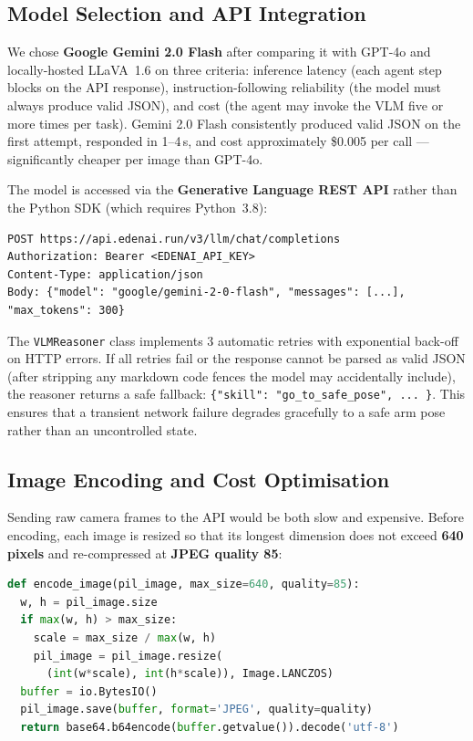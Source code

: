 \subsection{Model Selection and API Integration}

We chose \textbf{Google Gemini 2.0 Flash} after comparing it with GPT-4o and
locally-hosted LLaVA~1.6 on three criteria: inference latency (each agent step
blocks on the API response), instruction-following reliability (the model must
always produce valid JSON), and cost (the agent may invoke the VLM five or more
times per task).
Gemini 2.0 Flash consistently produced valid JSON on the first attempt,
responded in 1--4\,s, and cost approximately \$0.005 per call --- significantly
cheaper per image than GPT-4o.

The model is accessed via the \textbf{Generative Language REST API} rather than
the Python SDK (which requires Python~3.8):

\begin{lstlisting}[language={}, numbers=none,
    caption={REST API endpoint for Gemini 2.0 Flash via Eden AI.}]
POST https://api.edenai.run/v3/llm/chat/completions
Authorization: Bearer <EDENAI_API_KEY>
Content-Type: application/json
Body: {"model": "google/gemini-2-0-flash", "messages": [...], "max_tokens": 300}
\end{lstlisting}

The \texttt{VLMReasoner} class implements 3 automatic retries with exponential
back-off on HTTP errors.
If all retries fail or the response cannot be parsed as valid JSON (after
stripping any markdown code fences the model may accidentally include), the
reasoner returns a safe fallback: \texttt{\{"skill": "go\_to\_safe\_pose", ...
\}}.
This ensures that a transient network failure degrades gracefully to a safe arm
pose rather than an uncontrolled state.

\subsection{Image Encoding and Cost Optimisation}

Sending raw camera frames to the API would be both slow and expensive.
Before encoding, each image is resized so that its longest dimension does not
exceed \textbf{640 pixels} and re-compressed at \textbf{JPEG quality 85}:

\begin{lstlisting}[language=Python, numbers=none]
def encode_image(pil_image, max_size=640, quality=85):
  w, h = pil_image.size
  if max(w, h) > max_size:
    scale = max_size / max(w, h)
    pil_image = pil_image.resize(
      (int(w*scale), int(h*scale)), Image.LANCZOS)
  buffer = io.BytesIO()
  pil_image.save(buffer, format='JPEG', quality=quality)
  return base64.b64encode(buffer.getvalue()).decode('utf-8')
\end{lstlisting}

